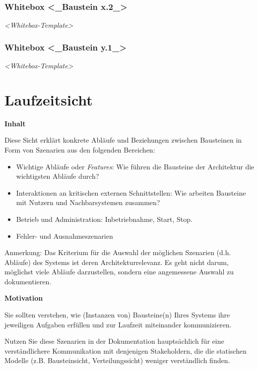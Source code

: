 \documentclass[
]{article}
\begin{document}
\subsubsection{Whitebox \textless\_Baustein
x.2\_\textgreater{}}\label{_whitebox_baustein_x_2}

\emph{\textless Whitebox-Template\textgreater{}}

\subsubsection{Whitebox \textless\_Baustein
y.1\_\textgreater{}}\label{_whitebox_baustein_y_1}

\emph{\textless Whitebox-Template\textgreater{}}

\section{Laufzeitsicht}\label{section-runtime-view}

\textbf{Inhalt}

Diese Sicht erklärt konkrete Abläufe und Beziehungen zwischen Bausteinen
in Form von Szenarien aus den folgenden Bereichen:

\begin{itemize}
\item
  Wichtige Abläufe oder \emph{Features}: Wie führen die Bausteine der
  Architektur die wichtigsten Abläufe durch?
\item
  Interaktionen an kritischen externen Schnittstellen: Wie arbeiten
  Bausteine mit Nutzern und Nachbarsystemen zusammen?
\item
  Betrieb und Administration: Inbetriebnahme, Start, Stop.
\item
  Fehler- und Ausnahmeszenarien
\end{itemize}

Anmerkung: Das Kriterium für die Auswahl der möglichen Szenarien (d.h.
Abläufe) des Systems ist deren Architekturrelevanz. Es geht nicht darum,
möglichst viele Abläufe darzustellen, sondern eine angemessene Auswahl
zu dokumentieren.

\textbf{Motivation}

Sie sollten verstehen, wie (Instanzen von) Bausteine(n) Ihres Systems
ihre jeweiligen Aufgaben erfüllen und zur Laufzeit miteinander
kommunizieren.

Nutzen Sie diese Szenarien in der Dokumentation hauptsächlich für eine
verständlichere Kommunikation mit denjenigen Stakeholdern, die die
statischen Modelle (z.B. Bausteinsicht, Verteilungssicht) weniger
verständlich finden.
\end{document}

